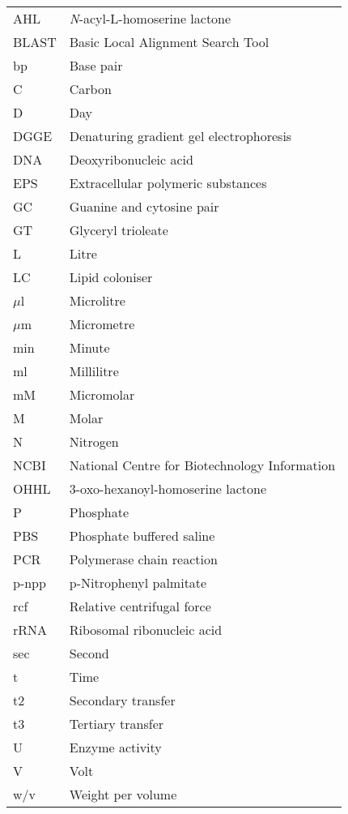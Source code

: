 \documentclass[11pt]{article}
\begin{document}
\begin{table}
\begin{tabular}{  p{6.9cm} | p{6.9cm} }
\hline
AHL & \emph{N}-acyl-L-homoserine lactone \\
BLAST & Basic Local Alignment Search Tool  \\
bp & Base pair \\
C & Carbon \\
D & Day \\
DGGE & Denaturing gradient gel electrophoresis \\
DNA & Deoxyribonucleic acid  \\
 EPS & Extracellular polymeric substances \\
 GC & Guanine and cytosine pair \\
GT & Glyceryl trioleate \\
L & Litre \\
LC & Lipid coloniser \\
$\mu$l & Microlitre \\
$\mu$m & Micrometre \\
min & Minute \\
ml & Millilitre \\
mM & Micromolar \\
M & Molar \\
N & Nitrogen \\
NCBI &  National Centre for Biotechnology Information \\
OHHL & 3-oxo-hexanoyl-homoserine lactone \\
P  &  Phosphate \\
PBS & Phosphate buffered saline \\
PCR & Polymerase chain reaction \\
 p-npp & p-Nitrophenyl palmitate \\
rcf & Relative centrifugal force \\
rRNA & Ribosomal ribonucleic acid \\
sec & Second \\
t & Time \\
 t2 & Secondary transfer \\
t3 & Tertiary transfer \\
U & Enzyme activity \\
V & Volt \\
w/v & Weight per volume \\
  \hline
\end{tabular}
\end{table}
\end{document}
